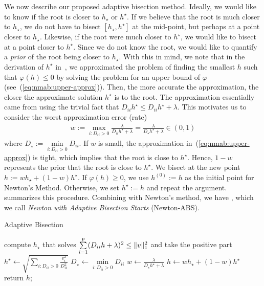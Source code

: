 We now describe our proposed adaptive bisection method.
Ideally, we would like to know if the root is closer to $h_\star$ or $h^\star$.
If we believe that the root is much closer to $h_\star$,
we do not have to bisect $[h_\star, h^\star]$ at the mid-point, 
but perhaps at a point closer to $h_\star$.
Likewise, if the root were much closer to $h^\star$, 
we would like to bisect at a point closer to $h^\star$.
Since we do not know the root, we would like to quantify a \emph{prior} of 
the root being closer to $h_\star$.
With this in mind, we note that in the derivation of $h^\star$
in~, we 
approximated the problem of finding the smallest $h$ such that $\varphi(h) \leq 0$
by solving the problem for an upper bound of $\varphi$ (see~(\ref{eq:nmab:upper-approx})).
Then, the more accurate the approximation, the closer the approximate solution $h^\star$ is to the root.
The approximation essentially came from using the trivial fact that $D_{ii} h^\star \leq D_{ii} h^\star + \lambda$.
This motivates us to consider the worst approximation error (rate)
\begin{align*}
    w
    := 
    \max\limits_{i: D_{ii} > 0} \frac{\lambda}{D_{ii} h^\star + \lambda}
    =
    \frac{\lambda}{D_\star h^\star + \lambda}
    \in 
    (0,1)
\end{align*}
where $D_\star := \min\limits_{i : D_{ii} > 0} D_{ii}$.
If $w$ is small, the approximation in~(\ref{eq:nmab:upper-approx}) is tight,
which implies that the root is close to $h^\star$.
Hence, $1-w$ represents the prior that the root is close to $h^\star$.
We bisect at the new point $h := wh_\star + (1-w)h^\star$.
If $\varphi(h) \geq 0$, we use $h^{(0)} := h$ as the initial point for Newton's Method.
Otherwise, we set $h^\star := h$ and repeat the argument.
 summarizes this procedure.
Combining  with Newton's method,
we have ,
which we call \emph{Newton with Adaptive Bisection Starts} (Newton-ABS).

\begin{algorithm}[t]
    \caption{Adaptive Bisection}\label{alg:nabs:ab}
    compute $h_\star$ that solves
    $
        \sum\limits_{i=1}^p
        (D_{ii} h + \lambda)^2
        \leq
        \|v\|_1^2
    $ and take the positive part\;
    $
        h^\star
        \gets
        \sqrt{
            \sum\limits_{i: D_{ii} > 0} \frac{v_i^2}{D_{ii}^2}
        }
    $\;
    $D_\star \gets \min\limits_{i : D_{ii} > 0} D_{ii}$\;
    $w \gets \frac{\lambda}{D_\star h^\star + \lambda}$\;
    $h \gets wh_\star + (1-w)h^\star$\;
    return $h$;
\end{algorithm}

